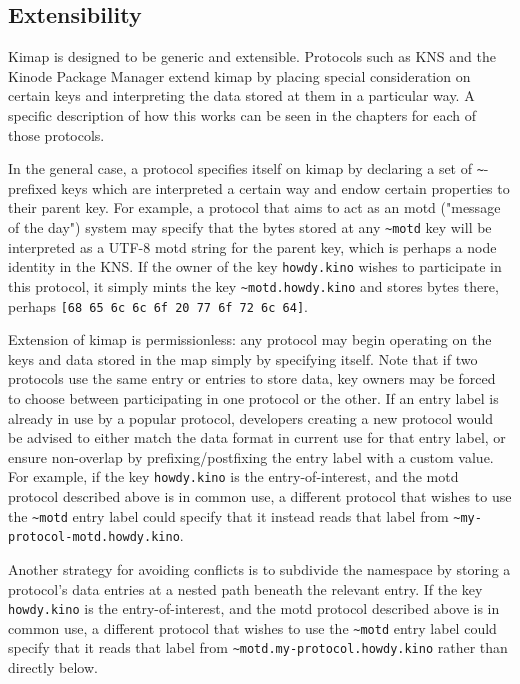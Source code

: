 \documentclass[runningheads]{llncs}
\begin{document}
\subsection{Extensibility}
\label{sec:extensibility}

Kimap is designed to be generic and extensible.
Protocols such as KNS and the Kinode Package Manager extend kimap by placing special consideration on certain keys and interpreting the data stored at them in a particular way.
A specific description of how this works can be seen in the chapters for each of those protocols.

In the general case, a protocol specifies itself on kimap by declaring a set of \verb|~|-prefixed keys which are interpreted a certain way and endow certain properties to their parent key. For example, a protocol that aims to act as an motd ("message of the day") system may specify that the bytes stored at any \verb|~motd| key will be interpreted as a UTF-8 motd string for the parent key, which is perhaps a node identity in the KNS. If the owner of the key \verb|howdy.kino| wishes to participate in this protocol, it simply mints the key \verb|~motd.howdy.kino| and stores bytes there, perhaps \verb|[68 65 6c 6c 6f 20 77 6f 72 6c 64]|.

Extension of kimap is permissionless: any protocol may begin operating on the keys and data stored in the map simply by specifying itself.
Note that if two protocols use the same entry or entries to store data, key owners may be forced to choose between participating in one protocol or the other.
If an entry label is already in use by a popular protocol, developers creating a new protocol would be advised to either match the data format in current use for that entry label, or ensure non-overlap by prefixing/postfixing the entry label with a custom value.
For example, if the key \verb|howdy.kino| is the entry-of-interest, and the motd protocol described above is in common use, a different protocol that wishes to use the \verb|~motd| entry label could specify that it instead reads that label from \verb|~my-protocol-motd.howdy.kino|.

Another strategy for avoiding conflicts is to subdivide the namespace by storing a protocol's data entries at a nested path beneath the relevant entry.
If the key \verb|howdy.kino| is the entry-of-interest, and the motd protocol described above is in common use, a different protocol that wishes to use the \verb|~motd| entry label could specify that it reads that label from \verb|~motd.my-protocol.howdy.kino| rather than directly below.
\end{document}
